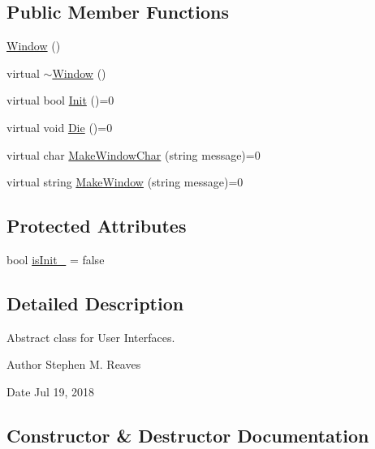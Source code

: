 \subsection*{Public Member Functions}
\begin{DoxyCompactItemize}
\item 
\mbox{\hyperlink{classWindow_a74e6087da23d3c24e9fac0245e5ec92c}{Window}} ()
\item 
virtual \mbox{\hyperlink{classWindow_a62b4a97b3c2e492f1d9a46092011e2d9}{$\sim$\+Window}} ()
\item 
virtual bool \mbox{\hyperlink{classWindow_a91ad1340d4f60465f0e6eef38f0e5fb1}{Init}} ()=0
\item 
virtual void \mbox{\hyperlink{classWindow_a5332552d06a88b58486c0ab803356d01}{Die}} ()=0
\item 
virtual char \mbox{\hyperlink{classWindow_ae770439748fb6b7dcdb3071860e687b3}{Make\+Window\+Char}} (string message)=0
\item 
virtual string \mbox{\hyperlink{classWindow_a3a24c6368cb054a5ca3b32db2558319f}{Make\+Window}} (string message)=0
\end{DoxyCompactItemize}
\subsection*{Protected Attributes}
\begin{DoxyCompactItemize}
\item 
bool \mbox{\hyperlink{classWindow_a06739ea2d178febdb7f0da5f775e5ba8}{is\+Init\+\_\+}} = false
\end{DoxyCompactItemize}


\subsection{Detailed Description}
Abstract class for User Interfaces. 

\begin{DoxyAuthor}{Author}
Stephen M. Reaves 
\end{DoxyAuthor}
\begin{DoxyDate}{Date}
Jul 19, 2018 
\end{DoxyDate}


\subsection{Constructor \& Destructor Documentation}
\mbox{\label{classWindow_a74e6087da23d3c24e9fac0245e5ec92c}} 

